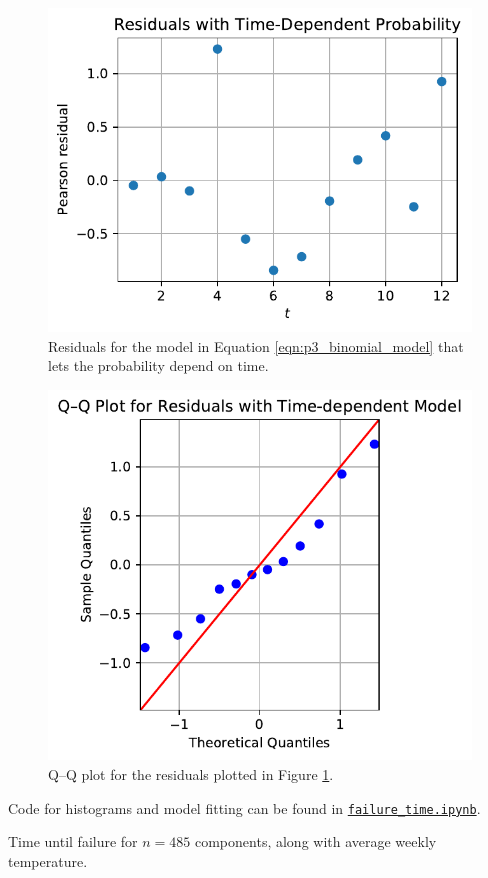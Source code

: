 \documentclass[letterpaper,11pt]{article}
\begin{document}
\begin{enumerate}
\begin{enumerate}
      \begin{figure}
        \centering
        \includegraphics{p3_residuals_time.pdf}
        \caption{Residuals for the model in Equation \ref{eqn:p3_binomial_model}
          that lets the probability depend on time.}
        \label{fig:p3_residuals_time}
      \end{figure}

      \begin{figure}
        \centering
        \includegraphics{p3_qq_time.pdf}
        \caption{Q--Q plot for the residuals plotted in Figure
          \ref{fig:p3_residuals_time}.}
        \label{fig:p3_qq_time}
      \end{figure}
    \end{enumerate}

    Code for histograms and model fitting can be found in
    \href{http://nbviewer.jupyter.org/github/ppham27/stat570/blob/master/final/failure\_time.ipynb}{\texttt{failure\_time.ipynb}}.
  \end{enumerate}

\begin{table}
  \centering
  
  \caption{Time until failure for $n = 485$ components, along with average weekly
    temperature.}
  \label{tab:failure_time_data}
\end{table}
\end{document}
